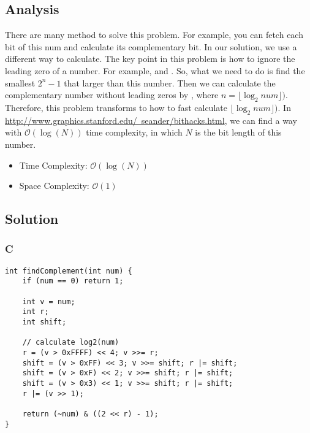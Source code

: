 \subsection*{Analysis}
There are many method to solve this problem. For example, you can fetch each bit of this num and calculate its complementary bit. In our solution, we use a different way to calculate. The key point in this problem is how to ignore the leading zero of a number. For example,  and . So, what we need to do is find the smallest $2^n - 1$ that larger than this number. Then we can calculate the complementary number without leading zeros by , where $n = \lfloor{\log_2{num}}\rfloor)$. Therefore, this problem transforms to how to fast calculate $\lfloor{\log_2{num}}\rfloor)$. In \href{http://www.graphics.stanford.edu/~seander/bithacks.html}{http://www.graphics.stanford.edu/~seander/bithacks.html}, we can find a way with $\mathcal{O}(\log(N))$ time complexity, in which $N$ is the bit length of this number.

\begin{itemize}
\item Time Complexity: $\mathcal{O}(\log(N))$
\item Space Complexity: $\mathcal{O}(1)$
\end{itemize}

\subsection*{Solution}
\subsubsection*{C}
\begin{verbatim}
int findComplement(int num) {
    if (num == 0) return 1;
    
    int v = num;
    int r;
    int shift;
    
    // calculate log2(num)
    r = (v > 0xFFFF) << 4; v >>= r;
    shift = (v > 0xFF) << 3; v >>= shift; r |= shift;
    shift = (v > 0xF) << 2; v >>= shift; r |= shift;
    shift = (v > 0x3) << 1; v >>= shift; r |= shift;
    r |= (v >> 1);
    
    return (~num) & ((2 << r) - 1);
}
\end{verbatim}

\newpage

